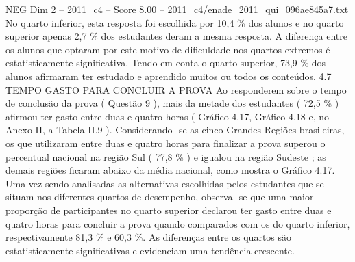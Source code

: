 \begin{textsample}{NEG Dim 2 – 2011\_c4 – Score 8.00 – 2011\_c4/enade\_2011\_qui\_096ae845a7.txt}
No quarto inferior, esta resposta foi escolhida por 10,4 \% dos alunos e no quarto superior apenas 2,7 \% dos estudantes deram a mesma resposta.
A diferença entre os alunos que optaram por este motivo de dificuldade nos quartos extremos é estatisticamente significativa.
Tendo em conta o quarto superior, 73,9 \% dos alunos afirmaram ter estudado e aprendido muitos ou todos os conteúdos. 4.7 TEMPO GASTO PARA CONCLUIR A PROVA Ao responderem sobre o tempo de conclusão da prova ( Questão 9 ), mais da metade dos estudantes ( 72,5 \% ) afirmou ter gasto entre duas e quatro horas ( Gráfico 4.17, Gráfico 4.18 e, no Anexo II, a Tabela II.9 ).
Considerando -se as cinco Grandes Regiões brasileiras, os que utilizaram entre duas e quatro horas para finalizar a prova superou o percentual nacional na região Sul ( 77,8 \% ) e igualou na região Sudeste ; as demais regiões ficaram abaixo da média nacional, como mostra o Gráfico 4.17.
Uma vez sendo analisadas as alternativas escolhidas pelos estudantes que se situam nos diferentes quartos de desempenho, observa -se que uma maior proporção de participantes no quarto superior declarou ter gasto entre duas e quatro horas para concluir a prova quando comparados com os do quarto inferior, respectivamente 81,3 \% e 60,3 \%.
As diferenças entre os quartos são estatisticamente significativas e evidenciam uma tendência crescente.

\end{textsample}
